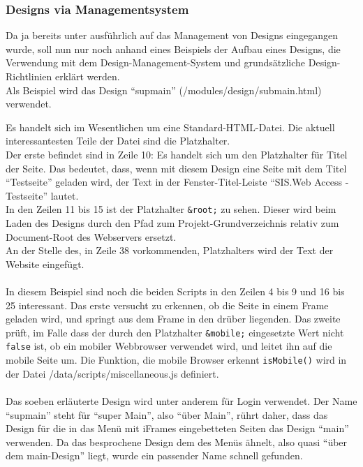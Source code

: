 \subsubsection{Designs via Managementsystem}
Da ja bereits unter  ausführlich auf das Management von Designs eingegangen wurde, soll nun nur noch anhand eines Beispiels der Aufbau eines Designs, die Verwendung mit dem Design-Management-System und grundsätzliche Design-Richtlinien erklärt werden.\\
Als Beispiel wird das Design \enquote{supmain} (/modules/design/submain.html) verwendet.

Es handelt sich im Wesentlichen um eine Standard-HTML-Datei. Die aktuell interessantesten Teile der Datei sind die Platzhalter.\\
Der erste befindet sind in Zeile 10: Es handelt sich um den Platzhalter für Titel der Seite. Das bedeutet, dass, wenn mit diesem Design eine Seite mit dem Titel \enquote{Testseite} geladen wird, der Text in der Fenster-Titel-Leiste \enquote{SIS.Web Access - Testseite} lautet.\\
In den Zeilen 11 bis 15 ist der Platzhalter \texttt{\&root;} zu sehen. Dieser wird beim Laden des Designs durch den Pfad zum Projekt-Grundverzeichnis relativ zum Document-Root des Webservers ersetzt.\\
An der Stelle des, in Zeile 38 vorkommenden, Platzhalters wird der Text der Website eingefügt.\\
\\
In diesem Beispiel sind noch die beiden Scripts in den Zeilen 4 bis 9 und 16 bis 25 interessant. Das erste versucht zu erkennen, ob die Seite in einem Frame geladen wird, und springt aus dem Frame in den drüber liegenden. Das zweite prüft, im Falle dass der durch den Platzhalter \texttt{\&mobile;} eingesetzte Wert nicht \texttt{false} ist, ob ein mobiler Webbrowser verwendet wird, und leitet ihn auf die mobile Seite um. Die Funktion, die mobile Browser erkennt \texttt{isMobile()} wird in der Datei /data/scripts/miscellaneous.js definiert.\\
\\
Das soeben erläuterte Design wird unter anderem für Login verwendet. Der Name \enquote{supmain} steht für \enquote{super Main}, also \enquote{über Main}, rührt daher, dass das Design für die in das Menü mit iFrames eingebetteten Seiten das Design \enquote{main} verwenden. Da das besprochene Design dem des Menüs ähnelt, also quasi \enquote{über dem main-Design} liegt, wurde ein passender Name schnell gefunden. 